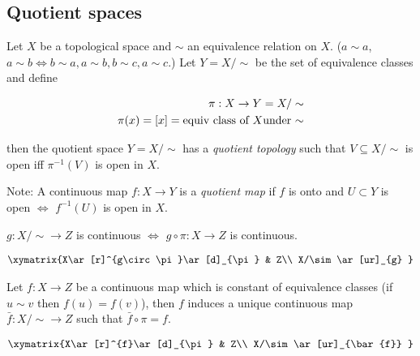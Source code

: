 \subsection{Quotient spaces}
\begin{defn}
Let $X$ be a topological space and $\sim$ an equivalence relation
on $X$. ($a\sim a$, $a\sim b\Leftrightarrow b\sim a,a\sim b,b\sim c,a\sim c$.)
Let $Y=X/\sim$ be the set of equivalence classes and define

\begin{align*}
\pi:X\to Y=X/\sim\\
\pi(x)=[x]=\text{equiv class of \ensuremath{X}under \ensuremath{\sim}}
\end{align*}


then the quotient space $Y=X/\sim$ has a \emph{quotient topology}
such that $V\subseteq X/\sim$ is open iff $\pi^{-1}(V)$ is open
in $X$.

Note: A continuous map $f:X\to Y$ is a \emph{quotient map} if $f$
is onto and $U\subset Y$ is open $\Leftrightarrow$ $f^{-1}(U)$
is open in $X$.
\end{defn}

\begin{thm}
$g:X/\sim\to Z$ is continuous $\Leftrightarrow$ $g\circ\pi:X\to Z$
is continuous.

\begin{align*}
\xymatrix{X\ar[r]^{g\circ\pi}\ar[d]_{\pi} & Z\\
X/\sim\ar[ur]_{g}
}
\end{align*}
\end{thm}
\begin{cor}
Let $f:X\to Z$ be a continuous map which is constant of equivalence
classes (if $u\sim v$ then $f(u)=f(v)$), then $f$ induces a unique
continuous map $\bar{f}:X/\sim\to Z$ such that $\bar{f}\circ\pi=f$.
\end{cor}
\begin{align*}
\xymatrix{X\ar[r]^{f}\ar[d]_{\pi} & Z\\
X/\sim\ar[ur]_{\bar{f}}
}
\end{align*}


